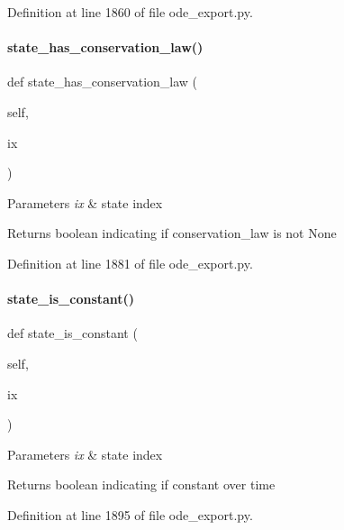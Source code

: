 Definition at line 1860 of file ode\+\_\+export.\+py.

\mbox{\label{classamici_1_1ode__export_1_1_o_d_e_model_a6c2d3ae2fc4dc74b8fba88db41ed8fae}} 
\paragraph{\texorpdfstring{state\_has\_conservation\_law()}{state\_has\_conservation\_law()}}
{\footnotesize\ttfamily def state\+\_\+has\+\_\+conservation\+\_\+law (\begin{DoxyParamCaption}\item[{}]{self,  }\item[{}]{ix }\end{DoxyParamCaption})}


\begin{DoxyParams}{Parameters}
{\em ix} & state index\\
\hline
\end{DoxyParams}
\begin{DoxyReturn}{Returns}
boolean indicating if conservation\+\_\+law is not None 
\end{DoxyReturn}


Definition at line 1881 of file ode\+\_\+export.\+py.

\mbox{\label{classamici_1_1ode__export_1_1_o_d_e_model_a5d453b4edf6d9cd24e024841a0cd70c6}} 
\paragraph{\texorpdfstring{state\_is\_constant()}{state\_is\_constant()}}
{\footnotesize\ttfamily def state\+\_\+is\+\_\+constant (\begin{DoxyParamCaption}\item[{}]{self,  }\item[{}]{ix }\end{DoxyParamCaption})}


\begin{DoxyParams}{Parameters}
{\em ix} & state index\\
\hline
\end{DoxyParams}
\begin{DoxyReturn}{Returns}
boolean indicating if constant over time 
\end{DoxyReturn}


Definition at line 1895 of file ode\+\_\+export.\+py.

